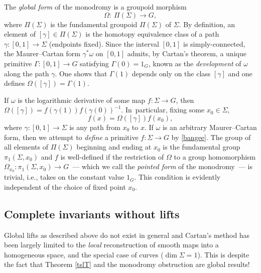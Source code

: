 \documentclass[10pt,a4paper]{amsart}
\numberwithin{equation}{section}
\begin{document}
The {\it global form} of the monodromy is a groupoid morphism
\begin{equation}
 \Omega \colon\ \Pi(\Sigma) \rightarrow G,\label{otter}
\end{equation}
where $\Pi(\Sigma) $ is the fundamental groupoid $\Pi(\Sigma )$ of
$\Sigma $. By definition, an element of $[\gamma] \in \Pi(\Sigma )$ is
the homotopy equivalence class of a path
$\gamma \colon [0,1] \rightarrow \Sigma $ (endpoints fixed). Since the
interval $[0,1]$ is simply-connected, the Maurer--Cartan form
$\gamma^*\omega $ on $[0,1]$ admits, by Cartan's theorem, a unique
primitive $\Gamma \colon [0,1] \rightarrow G$ satisfying
$\Gamma (0)=1_G$, known as the {\it development} of $\omega $ along
the path $\gamma $. One shows that $\Gamma (1) $ depends only on the
class $[\gamma]$ and one defines $\Omega([\gamma])=\Gamma (1)$.

If $\omega $ is the logarithmic derivative of some map $f \colon
\Sigma \rightarrow G$, then
$\Omega([\gamma])=f(\gamma(1))f(\gamma(0))^{-1}$. In~particular,
fixing some $x_0 \in \Sigma $,
\begin{equation}
f(x)=\Omega([\gamma])f(x_0),
\label{bangee}
\end{equation}
where $\gamma \colon [0,1] \rightarrow \Sigma $ is any
path from $x_0$ to $x$. If $\omega $ is an arbitrary Maurer--Cartan
form, then we attempt to {\em define} a primitive $f \colon \Sigma
\rightarrow G$ by \eqref{bangee}. The group of all elements of
$\Pi(\Sigma)$ beginning and ending at $x_0$ is the fundamental group
$\pi_1(\Sigma , x_0)$ and $f$ is well-defined if the restriction of
$\Omega$ to a group homomorphism $\Omega_{x_0} \colon
\pi_1(\Sigma,x_0) \rightarrow G$~--- which we call the {\it pointed
form} of the monodromy~--- is trivial, i.e., takes on the constant
value $1_G$. This condition is evidently independent of the choice of
fixed point $x_0$.

\subsection*{Complete invariants without lifts}
Global lifts as
described above do not exist in general and Cartan's method has been
largely limited to the {\em local} reconstruction of smooth maps into
a homogeneous space, and the special case of curves ($\dim \Sigma =
1$). This is despite the fact that Theorem \ref{tslT} and the monodromy
obstruction are global results!
\end{document}

